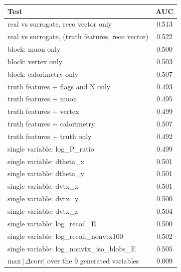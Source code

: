 \begin{tabular}{lc}
\toprule
Test & AUC \\
\midrule
real vs surrogate, reco vector only & 0.513 \\
real vs surrogate, (truth features, reco vector) & 0.522 \\
\midrule
block: muon only & 0.500 \\
block: vertex only & 0.503 \\
block: calorimetry only & 0.507 \\
truth features + flags and N only & 0.493 \\
truth features + muon & 0.495 \\
truth features + vertex & 0.499 \\
truth features + calorimetry & 0.507 \\
truth features + truth only & 0.492 \\
single variable: log\_P\_ratio & 0.499 \\
single variable: dtheta\_x & 0.501 \\
single variable: dtheta\_y & 0.501 \\
single variable: dvtx\_x & 0.501 \\
single variable: dvtx\_y & 0.500 \\
single variable: dvtx\_z & 0.504 \\
single variable: log\_recoil\_E & 0.500 \\
single variable: log\_recoil\_nonvtx100 & 0.502 \\
single variable: log\_nonvtx\_iso\_blobs\_E & 0.505 \\
\midrule
max $|\Delta$corr$|$ over the 9 generated variables & 0.009 \\
\bottomrule
\end{tabular}
